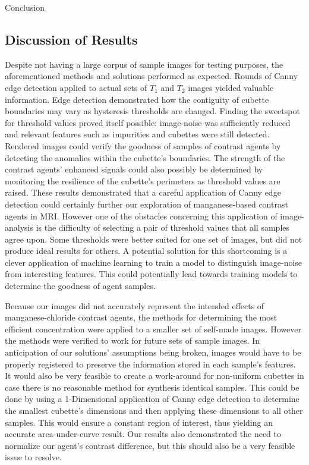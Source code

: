 \documentclass[a4paper,12pt]{article}
\begin{document}
\newpage
\begin{section}{Conclusion}
\subsection{Discussion of Results}

Despite not having a large corpus of sample images for testing purposes, the aforementioned methods and solutions performed as expected. Rounds of Canny edge detection applied to actual sets of $T_1$ and $T_2$ images yielded valuable information. Edge detection demonstrated how the contiguity of cubette boundaries may vary as hysteresis thresholds are changed. Finding the sweetspot for threshold values proved itself possible: image-noise was sufficiently reduced and relevant features such as impurities and cubettes were still detected. Rendered images could verify the goodness of samples of contrast agents by detecting the anomalies within the cubette's boundaries. The strength of the contrast agents' enhanced signals could also possibly be determined by monitoring the resilience of the cubette's perimeters as threshold values are raised. These results demonstrated that a careful application of Canny edge detection could certainly further our exploration of manganese-based contrast agents in MRI. However one of the obstacles concerning this application of image-analysis is the difficulty of selecting a pair of threshold values that all samples agree upon. Some thresholds were better suited for one set of images, but did not produce ideal results for others. A potential solution for this shortcoming is a clever application of machine learning to train a model to distinguish image-noise from interesting features. This could potentially lead towards training models to determine the goodness of agent samples.

Because our images did not accurately represent the intended effects of manganese-chloride contrast agents, the methods for determining the most efficient concentration were applied to a smaller set of self-made images. However the methods were verified to work for future sets of sample images. In anticipation of our solutions' assumptions being broken, images would have to be properly registered to preserve the information stored in each sample's features. It would also be very feasible to create a work-around for non-uniform cubettes in case there is no reasonable method for synthesis identical samples. This could be done by using a 1-Dimensional application of Canny edge detection to determine the smallest cubette's dimensions and then applying these dimensions to all other samples. This would ensure a constant region of interest, thus yielding an accurate area-under-curve result. Our results also demonstrated the need to normalize our agent's contrast difference, but this should also be a very feasible issue to resolve.


\end{section}
\end{document}
